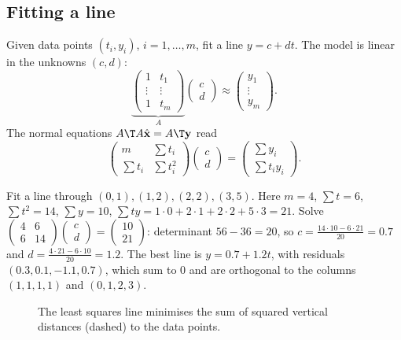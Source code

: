 \subsection*{Fitting a line}

Given data points $(t_i,y_i)$, $i=1,\dots,m$, fit a line $y=c+dt$. The model is linear in the unknowns $(c,d)$:
\[ \underbrace{\begin{pmatrix}1&t_1\\\vdots&\vdots\\1&t_m\end{pmatrix}}_{A}\begin{pmatrix}c\\d\end{pmatrix}\approx\begin{pmatrix}y_1\\\vdots\\y_m\end{pmatrix}. \]
The normal equations $A\T A\hat{\mathbf{x}}=A\T\mathbf{y}$ read
\[ \begin{pmatrix}m&\sum t_i\\\sum t_i&\sum t_i^2\end{pmatrix}\begin{pmatrix}c\\d\end{pmatrix}=\begin{pmatrix}\sum y_i\\\sum t_iy_i\end{pmatrix}. \]

\begin{example}
Fit a line through $(0,1),(1,2),(2,2),(3,5)$. Here $m=4$, $\sum t=6$, $\sum t^2=14$, $\sum y=10$, $\sum ty=1\cdot0+2\cdot1+2\cdot2+5\cdot3=21$. Solve $\begin{pmatrix}4&6\\6&14\end{pmatrix}\begin{pmatrix}c\\d\end{pmatrix}=\begin{pmatrix}10\\21\end{pmatrix}$: determinant $56-36=20$, so $c=\frac{14\cdot10-6\cdot21}{20}=0.7$ and $d=\frac{4\cdot21-6\cdot10}{20}=1.2$. The best line is $y=0.7+1.2t$, with residuals $(0.3,0.1,-1.1,0.7)$, which sum to $0$ and are orthogonal to the columns $(1,1,1,1)$ and $(0,1,2,3)$.
\end{example}

\begin{figure}[h]
\centering
{}
\caption{The least squares line minimises the sum of squared vertical distances (dashed) to the data points.}
\end{figure}

